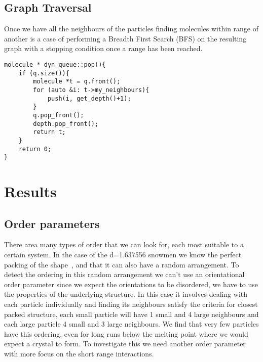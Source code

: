 \section{Graph Traversal}
\label{sec:graph traversal}

Once we have all the neighbours of the particles finding molecules within range of another is a case of performing a Breadth First Search (BFS) on the resulting graph with a stopping condition once a range has been reached.

\begin{lstlisting}[language=myc]
molecule * dyn_queue::pop(){
    if (q.size()){
        molecule *t = q.front();
        for (auto &i: t->my_neighbours){
            push(i, get_depth()+1);
        }
        q.pop_front();
        depth.pop_front();
        return t;
    }
    return 0;
}
\end{lstlisting}

\chapter{Results}

\section{Order parameters}
\label{sec:order parameters}

There area many types of order that we can look for, each most suitable to a certain system. In the case of the d=1.637556 snowmen we know the perfect packing of the shape~\figref{}, and that it can also have a random arrangement. To detect the ordering in this random arrangement we can't use an orientational order parameter since we expect the orientations to be disordered, we have to use the properties of the underlying structure. In this case it involves dealing with each particle individually and finding its neighbours satisfy the criteria for closest packed structure, each small particle will have 1 small and 4 large neighbours and each large particle 4 small and 3 large neighbours\tocheck. We find that very few particles have this ordering, even for long runs below the melting point where we would expect a crystal to form. To investigate this we need another order parameter with more focus on the short range interactions.

